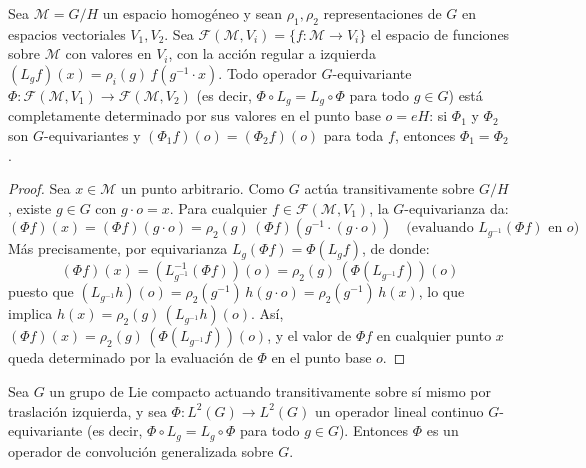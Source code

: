 \begin{theorem}\label{thm:correspondencia_geometria_equivarianza}
Sea $\mathcal{M} = G/H$ un espacio homogéneo y sean $\rho_1, \rho_2$ representaciones de $G$ en espacios vectoriales $V_1, V_2$. Sea $\mathcal{F}(\mathcal{M}, V_i) = \{f: \mathcal{M} \to V_i\}$ el espacio de funciones sobre $\mathcal{M}$ con valores en $V_i$, con la acción regular a izquierda $(L_g f)(x) = \rho_i(g)\, f(g^{-1} \cdot x)$. Todo operador $G$-equivariante $\Phi: \mathcal{F}(\mathcal{M}, V_1) \to \mathcal{F}(\mathcal{M}, V_2)$ (es decir, $\Phi \circ L_g = L_g \circ \Phi$ para todo $g \in G$) está completamente determinado por sus valores en el punto base $o = eH$: si $\Phi_1$ y $\Phi_2$ son $G$-equivariantes y $(\Phi_1 f)(o) = (\Phi_2 f)(o)$ para toda $f$, entonces $\Phi_1 = \Phi_2$.
\end{theorem}

\begin{proof}
Sea $x \in \mathcal{M}$ un punto arbitrario. Como $G$ actúa transitivamente sobre $G/H$, existe $g \in G$ con $g \cdot o = x$. Para cualquier $f \in \mathcal{F}(\mathcal{M}, V_1)$, la $G$-equivarianza da:
\[
(\Phi f)(x) = (\Phi f)(g \cdot o) = \rho_2(g)\,(\Phi f)(g^{-1} \cdot (g \cdot o)) \quad \text{(evaluando } L_{g^{-1}}(\Phi f) \text{ en } o\text{)}
\]
Más precisamente, por equivarianza $L_g(\Phi f) = \Phi(L_g f)$, de donde:
\[
(\Phi f)(x) = (L_{g^{-1}}^{-1}(\Phi f))(o) = \rho_2(g)\,(\Phi(L_{g^{-1}} f))(o)
\]
puesto que $(L_{g^{-1}} h)(o) = \rho_2(g^{-1})\,h(g \cdot o) = \rho_2(g^{-1})\,h(x)$, lo que implica $h(x) = \rho_2(g)\,(L_{g^{-1}} h)(o)$. Así, $(\Phi f)(x) = \rho_2(g)\,(\Phi(L_{g^{-1}} f))(o)$, y el valor de $\Phi f$ en cualquier punto $x$ queda determinado por la evaluación de $\Phi$ en el punto base $o$.
\end{proof}

\begin{corollary}\label{cor:operadores_equivariantes}
Sea $G$ un grupo de Lie compacto actuando transitivamente sobre sí mismo por traslación izquierda, y sea $\Phi: L^2(G) \to L^2(G)$ un operador lineal continuo $G$-equivariante (es decir, $\Phi \circ L_g = L_g \circ \Phi$ para todo $g \in G$). Entonces $\Phi$ es un operador de convolución generalizada sobre $G$.
\end{corollary}

